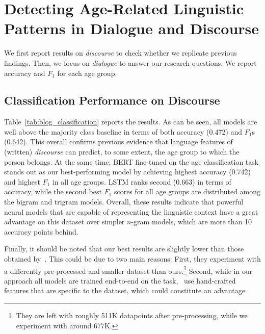 \section{Detecting Age-Related Linguistic Patterns in Dialogue and Discourse}
\label{sec:exp1_results}

We first report results on \emph{discourse}
to check whether we replicate
previous findings. Then, we focus on \emph{dialogue} to answer our research questions. We report accuracy and $F_1$ for each age group.

\subsection{Classification Performance on Discourse}
Table~\ref{tab:blog_classification} reports the results.
As can be seen,
all models are well above the majority class baseline in terms of both accuracy (0.472) and 
$F_1$s (0.642). This overall confirms previous evidence \citep{schler2006effects} that language features of (written) \emph{discourse} can predict, to some extent, the age group to which the person
belongs. At the same time, BERT fine-tuned on the age classification task stands out as our best-performing model by achieving highest accuracy (0.742) and highest $F_1$ in all age groups.
LSTM ranks  second (0.663) in terms of accuracy, while the second best $F_1$ scores for all age groups are distributed among the bigram and trigram models.
Overall, these results indicate that powerful neural models that are capable of representing the linguistic context %
have a great advantage on this dataset over simpler $n$-gram models, which are more than 10 accuracy points behind. 

Finally, it should be noted that our best results are slightly lower than those obtained by~\citet{schler2006effects}. This could be due to two main reasons: First, they experiment with a
differently pre-processed and smaller
dataset than ours.\footnote{They are left with roughly 511K datapoints after pre-processing, 
while we experiment with around 677K.}
Second, while in our approach all models are trained end-to-end on the task,~\citet{schler2006effects} use
hand-crafted features that are specific to the dataset, 
which could constitute an advantage.


